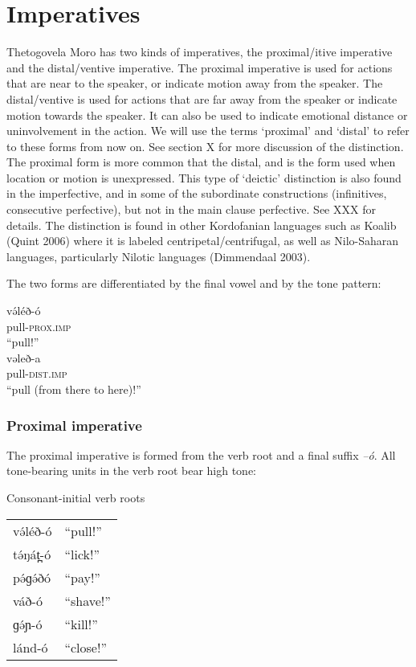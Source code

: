 \chapter{Imperatives}\label{chapter:imperative}


Thetogovela Moro has two kinds of imperatives, the proximal/itive imperative and the distal/ventive imperative. The proximal imperative is used for actions that are near to the speaker, or indicate motion away from the speaker. The distal/ventive is used for actions that are far away from the speaker or indicate motion towards the speaker. It can also be used to indicate emotional distance or uninvolvement in the action. We will use the terms ‘proximal’ and ‘distal’ to refer to these forms from now on. See section X for more discussion of the distinction. The proximal form is more common that the distal, and is the form used when location or motion is unexpressed. This type of ‘deictic’ distinction is also found in the imperfective, and in some of the subordinate constructions (infinitives, consecutive perfective), but not in the main clause perfective. See XXX for details. The distinction is found in other Kordofanian languages such as Koalib (Quint 2006) where it is labeled centripetal/centrifugal, as well as Nilo-Saharan languages, particularly Nilotic languages (Dimmendaal 2003). 

The two forms are differentiated by the final vowel and by the tone pattern:

\ea
\begin{multicols}{2}
\gll və́léð-ó\\
pull-\textsc{prox.imp}\\
\trans “pull!”\\
 
\columnbreak 
\gll vəleð-a\\
pull-\textsc{dist.imp}\\
\trans “pull (from there to here)!”\\
\end{multicols}	
\z

\subsection{Proximal imperative}
The proximal imperative is formed from the verb root and a final suffix \textit{–ó}. All tone-bearing units in the verb root bear high tone:

\ea Consonant-initial verb roots\\
\begin{tabular}[t]{ll}
və́léð-ó				&	“pull!”\\
tə́ŋát̪-ó				&	“lick!”\\
pə́ɡə́ðó				&	“pay!”\\
váð-ó				&	“shave!”\\
ɡə́ɲ-ó				&	“kill!”\\
lánd-ó				&	“close!”\\
\end{tabular}
\z

